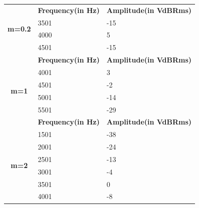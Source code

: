 \begin{table}[H]
    \centering
    \begin{tabular}{|c|l|l|}
        \hline
        \multirow{4}{*}{\textbf{m=0.2}} & \textbf{Frequency(in Hz)} & \textbf{Amplitude(in VdBRms)} \\ \cline{2-3}
                                        & 3501                      & -15                           \\ \cline{2-3}
                                        & 4000                      & 5                             \\ \cline{2-3}
                                        & 4501                      & -15                           \\ \hline
                                        & \textbf{Frequency(in Hz)} & \textbf{Amplitude(in VdBRms)} \\ \hline
        \multirow{4}{*}{\textbf{m=1}}   & 4001                      & 3                             \\ \cline{2-3}
                                        & 4501                      & -2                            \\ \cline{2-3}
                                        & 5001                      & -14                           \\ \cline{2-3}
                                        & 5501                      & -29                           \\ \hline
                                        & \textbf{Frequency(in Hz)} & \textbf{Amplitude(in VdBRms)} \\ \hline
        \multirow{11}{*}{\textbf{m=2}}  & 1501                      & -38                           \\ \cline{2-3}
                                        & 2001                      & -24                           \\ \cline{2-3}
                                        & 2501                      & -13                           \\ \cline{2-3}
                                        & 3001                      & -4                            \\ \cline{2-3}
                                        & 3501                      & 0                             \\ \cline{2-3}
                                        & 4001                      & -8                            \\ \cline{2-3}

\end{tabular}
\end{table}
